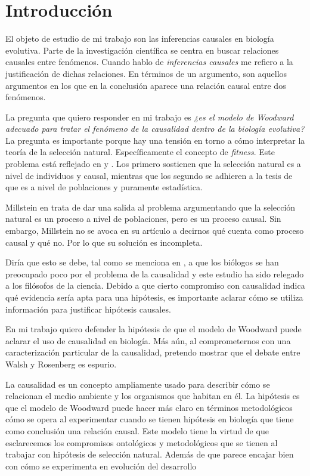 
\chapter*{Introducción}


\noindent El objeto de estudio de mi trabajo son las inferencias causales en biología evolutiva. Parte de la investigación científica se centra en buscar relaciones causales entre fenómenos. Cuando hablo de \textit{inferencias causales} me refiero a la justificación de dichas relaciones. En términos de un argumento, son aquellos argumentos en los que en la conclusión aparece una relación causal entre dos fenómenos.

La pregunta que quiero responder en mi trabajo es \textit{¿es el modelo de Woodward adecuado para tratar el fenómeno de la causalidad dentro de la biología evolutiva?} La pregunta es importante porque hay una tensión en torno a cómo interpretar la teoría de la selección natural. Específicamente el concepto de \textit{fitness}. Este problema está reflejado en \cite{Bouchard2004} y \cite{Walsh2002}. Los primero sostienen que la selección natural es a nivel de individuos y causal, mientras que los segundo se adhieren a la tesis de que es a nivel de poblaciones y puramente estadística.

Millstein en \cite{Millstein2006} trata de dar una salida al problema argumentando que la selección natural es un proceso a nivel de poblaciones, pero es un proceso causal. Sin embargo, Millstein no se avoca en su artículo a decirnos qué cuenta como proceso causal y qué no. Por lo que su solución es incompleta.

Diría que esto se debe, tal como se menciona en \cite{Uller}, a que los biólogos se han preocupado poco por el problema de la causalidad y este estudio ha sido relegado a los filósofos de la ciencia. Debido a que cierto compromiso con causalidad indica qué evidencia sería apta para una hipótesis, es importante aclarar cómo se utiliza información para justificar hipótesis causales.

En mi trabajo quiero defender la hipótesis de que el modelo de Woodward \cite{Woodward2000-WOOEAI} puede aclarar el uso de causalidad en biología.  Más aún, al comprometernos con una caracterización particular de la causalidad, pretendo mostrar que el debate entre Walsh y Rosenberg es espurio.

La causalidad es un concepto ampliamente usado para describir cómo se relacionan el medio ambiente y los organismos que habitan en él. La hipótesis es que el modelo de Woodward puede hacer más claro en términos metodológicos cómo se opera al experimentar cuando se tienen hipótesis en biología que tiene como conclusión una relación causal. Este modelo tiene la virtud de que esclarecemos los compromisos ontológicos y metodológicos que se tienen al trabajar con hipótesis de selección natural. Además de que parece encajar bien con cómo se experimenta en evolución del desarrollo \cite{Brakefield2014}

